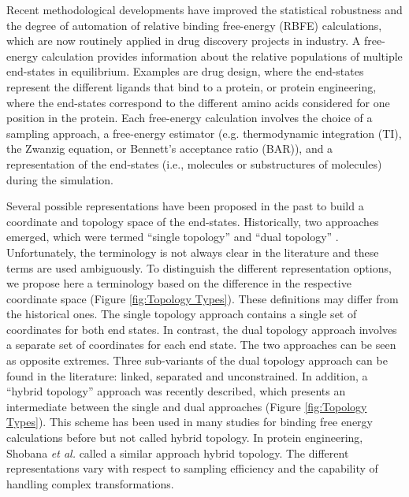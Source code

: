 Recent methodological developments have improved the statistical robustness and the degree of automation of relative binding free-energy (RBFE) calculations, which are now routinely applied in drug discovery projects in industry. 
\cite{Cournia2017,Cournia2020, Meier2021, Armacost2020, Barros2022,  Heinzelmann2021, Gapsys2020, Jespers2019, Raman2020, Christ2014, Gao2018, Tielker2021, Loeffler2018}
%
A free-energy calculation provides information about the relative populations of multiple end-states in equilibrium. Examples are drug design, where the end-states represent the different ligands that bind to a protein, \cite{Christ2009, Riniker2011, Wang2015, Wang2017, Aldeghi2016, Sidler2016,Yu2017, Jespers2019,Jiang2019, Paulsen2020} or protein engineering, where the end-states correspond to the different amino acids considered for one position in the protein.\cite{Shobana2000, Bieler2015B, Jespers2019B}
Each free-energy calculation involves the choice of a sampling approach, a free-energy estimator (e.g. thermodynamic integration (TI),\cite{Kirkwood1935} the Zwanzig equation,\cite{Zwanzig1954} or Bennett's acceptance ratio (BAR)\cite{Bennett1976}), and a representation of the end-states (i.e., molecules or substructures of molecules) during the simulation.

Several possible representations have been proposed in the past to build a coordinate and topology space of the end-states. 
Historically, two approaches emerged, which were termed ``single topology'' \cite{Pearlman1991, Pearlman1994} and ``dual topology'' \cite{Pearlman1991, Gao1989}.
Unfortunately, the terminology is not always clear in the literature and these terms are used ambiguously.\cite{Boresch1999, Rocklin2013, Fleck2021}
To distinguish the different representation options, we propose here a terminology based on the difference in the respective coordinate space (Figure \ref{fig:Topology Types}). These definitions may differ from the historical ones. The single topology approach contains a single set of coordinates for both end states. In contrast,  the dual topology approach involves a separate set of coordinates for each end state. The two approaches can be seen as opposite extremes. Three sub-variants of the dual topology approach can be found in the literature: linked, separated and unconstrained.
In addition, a ``hybrid topology'' approach was recently described,\cite{Jiang2019} which presents an intermediate between the single and dual approaches (Figure \ref{fig:Topology Types}). This scheme has been used in many studies for binding free energy calculations before but not called hybrid topology. In protein engineering, Shobana \textit{et al.} \cite{Shobana2000} called a similar approach hybrid topology.\cite{Shobana2000} The different representations vary with respect to sampling efficiency and the capability of handling complex transformations.

